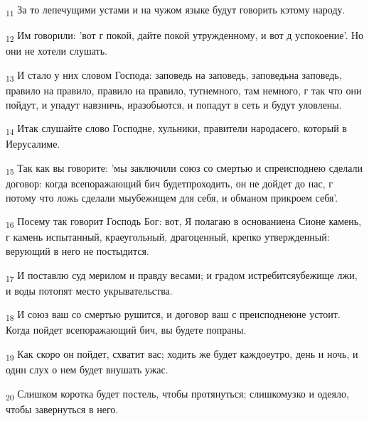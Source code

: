 \begin{tcolorbox}
\textsubscript{11} За то лепечущими устами и на чужом языке будут говорить кэтому народу.
\end{tcolorbox}
\begin{tcolorbox}
\textsubscript{12} Им говорили: 'вот г покой, дайте покой утружденному, и вот д успокоение'. Но они не хотели слушать.
\end{tcolorbox}
\begin{tcolorbox}
\textsubscript{13} И стало у них словом Господа: заповедь на заповедь, заповедьна заповедь, правило на правило, правило на правило, тутнемного, там немного, г так что они пойдут, и упадут навзничь, иразобьются, и попадут в сеть и будут уловлены.
\end{tcolorbox}
\begin{tcolorbox}
\textsubscript{14} Итак слушайте слово Господне, хульники, правители народасего, который в Иерусалиме.
\end{tcolorbox}
\begin{tcolorbox}
\textsubscript{15} Так как вы говорите: 'мы заключили союз со смертью и спреисподнею сделали договор: когда всепоражающий бич будетпроходить, он не дойдет до нас, г потому что ложь сделали мыубежищем для себя, и обманом прикроем себя'.
\end{tcolorbox}
\begin{tcolorbox}
\textsubscript{16} Посему так говорит Господь Бог: вот, Я полагаю в основаниена Сионе камень, г камень испытанный, краеугольный, драгоценный, крепко утвержденный: верующий в него не постыдится.
\end{tcolorbox}
\begin{tcolorbox}
\textsubscript{17} И поставлю суд мерилом и правду весами; и градом истребитсяубежище лжи, и воды потопят место укрывательства.
\end{tcolorbox}
\begin{tcolorbox}
\textsubscript{18} И союз ваш со смертью рушится, и договор ваш с преисподнеюне устоит. Когда пойдет всепоражающий бич, вы будете попраны.
\end{tcolorbox}
\begin{tcolorbox}
\textsubscript{19} Как скоро он пойдет, схватит вас; ходить же будет каждоеутро, день и ночь, и один слух о нем будет внушать ужас.
\end{tcolorbox}
\begin{tcolorbox}
\textsubscript{20} Слишком коротка будет постель, чтобы протянуться; слишкомузко и одеяло, чтобы завернуться в него.
\end{tcolorbox}
